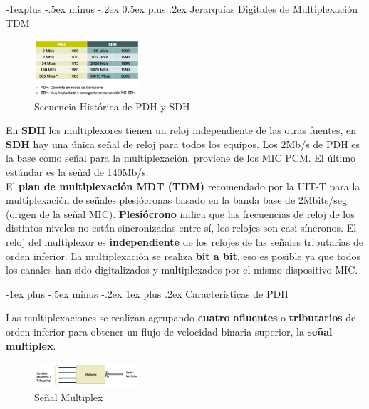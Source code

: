 \documentclass[10pt,portrait, twocolumn]{article}
\makeatletter
\renewcommand{\subsection}{\@startsection{subsection}{2}{0mm}%
                                {-1explus -.5ex minus -.2ex}%
                                {0.5ex plus .2ex}%
                                {\normalfont\normalsize\bfseries}}
\renewcommand{\subsubsection}{\@startsection{subsubsection}{3}{0mm}%
                                {-1ex plus -.5ex minus -.2ex}%
                                {1ex plus .2ex}%
                                {\normalfont\small\bfseries}}
\makeatother
\begin{document}
\begin{center}
\subsection{Jerarquías Digitales de Multiplexación TDM}
\end{center}

 
\begin{figure}[ht]
	\centering
     \includegraphics[width=0.35\textwidth]{PDHSDH}
      \caption{Secuencia Histórica de PDH y SDH}
      \label{fig:Regiones de frecuencias}
  \end{figure}
  
En \textbf{SDH} los multiplexores tienen un reloj independiente de las otras fuentes, en \textbf{SDH} hay una única señal de reloj para todos los equipos. Los 2Mb/s de PDH es la base como señal para la multiplexación, proviene de los MIC PCM. El último estándar es la señal de 140Mb/s.\\

El \textbf{plan de multiplexación MDT (TDM)} recomendado por la UIT-T para la multiplexación de señales plesiócronas basado en la banda base de 2Mbits/seg (origen de la señal MIC). \textbf{Plesiócrono} indica que las frecuencias de reloj de los distintos niveles no están sincronizadas entre sí, los relojes son casi-síncronos. El reloj del multiplexor es \textbf{independiente} de los relojes de las señales tributarias de orden inferior. La multiplexación se realiza \textbf{bit a bit}, eso es posible ya que todos los canales han sido digitalizados y multiplexados por el mismo dispositivo MIC.

\subsubsection{Características de PDH}

Las multiplexaciones se realizan agrupando \textbf{cuatro afluentes} o \textbf{tributarios} de orden inferior para obtener un flujo de velocidad binaria superior, la \textbf{señal multiplex}.

\begin{figure}[ht]
	\centering
     \includegraphics[width=0.35\textwidth]{Multiplex}
      \caption{Señal Multiplex}
      \label{fig:Regiones de frecuencias}
  \end{figure}
\end{document}
